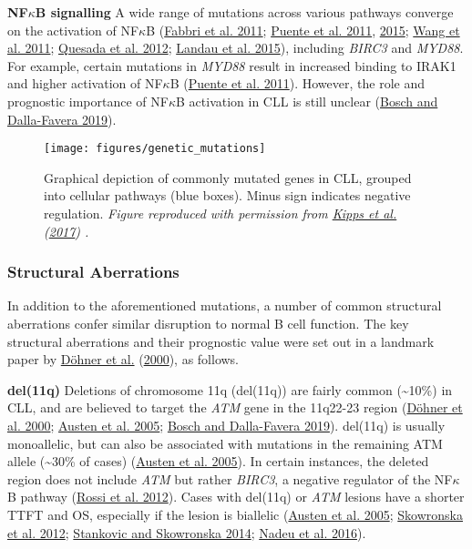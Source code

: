 \documentclass[11pt, a4paper, twosided]{book}
\begin{document}
\textbf{NF\(\kappa\)B signalling}
A wide range of mutations across various pathways converge on the activation of NF\(\kappa\)B (\protect\hyperlink{ref-Fabbri2011}{Fabbri et al. 2011}; \protect\hyperlink{ref-Puente2011}{Puente et al. 2011}, \protect\hyperlink{ref-Puente2015}{2015}; \protect\hyperlink{ref-Wang2011}{Wang et al. 2011}; \protect\hyperlink{ref-Quesada2012}{Quesada et al. 2012}; \protect\hyperlink{ref-Landau2015}{Landau et al. 2015}), including \emph{BIRC3} and \emph{MYD88}. For example, certain mutations in \emph{MYD88} result in increased binding to IRAK1 and higher activation of NF\(\kappa\)B (\protect\hyperlink{ref-Puente2011}{Puente et al. 2011}). However, the role and prognostic importance of NF\(\kappa\)B activation in CLL is still unclear (\protect\hyperlink{ref-Bosch2019}{Bosch and Dalla-Favera 2019}).


\begin{figure}

{\centering \texttt{[image: figures/genetic\_mutations]} 

}

\caption{Graphical depiction of commonly mutated genes in CLL, grouped into cellular pathways (blue boxes). Minus sign indicates negative regulation. \emph{Figure reproduced with permission from \protect\hyperlink{ref-Kipps2017}{Kipps et al.} (\protect\hyperlink{ref-Kipps2017}{2017}) .}}\label{fig:CLLmutations}
\end{figure}
\hypertarget{intro-structural-abberations}{%
\subsubsection{Structural Aberrations}\label{intro-structural-abberations}}

In addition to the aforementioned mutations, a number of common structural aberrations confer similar disruption to normal B cell function. The key structural aberrations and their prognostic value were set out in a landmark paper by \protect\hyperlink{ref-Dohner2000}{Döhner et al.} (\protect\hyperlink{ref-Dohner2000}{2000}), as follows.

\textbf{del(11q)}
Deletions of chromosome 11q (del(11q)) are fairly common (\textasciitilde10\%) in CLL, and are believed to target the \emph{ATM} gene in the 11q22-23 region (\protect\hyperlink{ref-Dohner2000}{Döhner et al. 2000}; \protect\hyperlink{ref-Austen2005}{Austen et al. 2005}; \protect\hyperlink{ref-Bosch2019}{Bosch and Dalla-Favera 2019}). del(11q) is usually monoallelic, but can also be associated with mutations in the remaining ATM allele (\textasciitilde30\% of cases) (\protect\hyperlink{ref-Austen2005}{Austen et al. 2005}). In certain instances, the deleted region does not include \emph{ATM} but rather \emph{BIRC3}, a negative regulator of the NF\(\kappa\)B pathway (\protect\hyperlink{ref-Rossi2012}{Rossi et al. 2012}). Cases with del(11q) or \emph{ATM} lesions have a shorter TTFT and OS, especially if the lesion is biallelic (\protect\hyperlink{ref-Austen2005}{Austen et al. 2005}; \protect\hyperlink{ref-Skowronska2012}{Skowronska et al. 2012}; \protect\hyperlink{ref-Stankovic2014}{Stankovic and Skowronska 2014}; \protect\hyperlink{ref-Nadeu2016}{Nadeu et al. 2016}).
\end{document}
